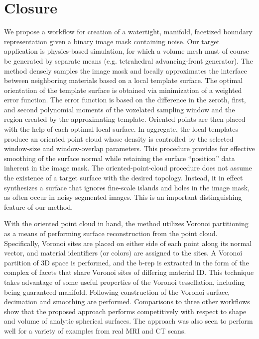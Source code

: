 \section{Closure}

We propose a workflow for creation of a watertight, manifold, facetized boundary representation given a binary image mask containing noise.  Our target application is physics-based simulation, for which a volume mesh must of course be generated by separate means (e.g. tetrahedral advancing-front generator).  The method densely samples the image mask and locally approximates the interface between neighboring materials based on a local template surface. The optimal orientation of the template surface is obtained via minimization of a weighted error function. The error function is based on the difference in the zeroth, first, and second polynomial moments of the voxelated sampling window and the region created by the approximating template. Oriented points are then placed with the help of each optimal local surface. In aggregate, the local templates produce an oriented point cloud whose density is controlled by the selected window-size and window-overlap parameters.  This procedure provides for effective smoothing of the surface normal while retaining the surface ``position'' data inherent in the image mask.  The oriented-point-cloud procedure does not assume the existence of a target surface with the desired topology.  Instead, it in effect synthesizes a surface that ignores fine-scale islands and holes in the image mask, as often occur in noisy segmented images.  This is an important distinguishing feature of our method.

With the oriented point cloud in hand, the method utilizes Voronoi partitioning as a means of performing surface reconstruction from the point cloud.  Specifically, Voronoi sites are placed on either side of each point along its normal vector, and material identifiers (or colors) are assigned to the sites. A Voronoi partition of 3D space is performed, and the b-rep is extracted in the form of the complex of facets that share Voronoi sites of differing material ID. This technique takes advantage of some useful properties of the Voronoi tessellation, including being guaranteed manifold. Following construction of the Voronoi surface, decimation and smoothing are performed.  Comparisons to three other workflows show that the proposed approach performs competitively with respect to shape and volume of analytic spherical surfaces. The approach was also seen to perform well for a variety of examples from real MRI and CT scans.

